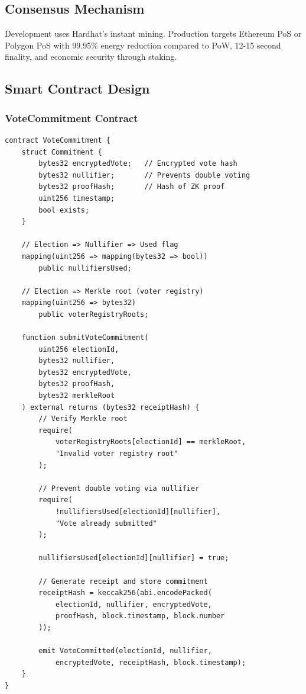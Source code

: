 \documentclass[conference]{IEEEtran}
\begin{document}
\subsection{Consensus Mechanism}
Development uses Hardhat's instant mining. Production targets Ethereum PoS or Polygon PoS with 99.95\% energy reduction compared to PoW, 12-15 second finality, and economic security through staking.

\subsection{Smart Contract Design}

\subsubsection{VoteCommitment Contract}

\begin{lstlisting}[style=solidity, caption={VoteCommitment Core Structure}]
contract VoteCommitment {
    struct Commitment {
        bytes32 encryptedVote;   // Encrypted vote hash
        bytes32 nullifier;       // Prevents double voting
        bytes32 proofHash;       // Hash of ZK proof
        uint256 timestamp;
        bool exists;
    }
    
    // Election => Nullifier => Used flag
    mapping(uint256 => mapping(bytes32 => bool)) 
        public nullifiersUsed;
    
    // Election => Merkle root (voter registry)
    mapping(uint256 => bytes32) 
        public voterRegistryRoots;
    
    function submitVoteCommitment(
        uint256 electionId,
        bytes32 nullifier,
        bytes32 encryptedVote,
        bytes32 proofHash,
        bytes32 merkleRoot
    ) external returns (bytes32 receiptHash) {
        // Verify Merkle root
        require(
            voterRegistryRoots[electionId] == merkleRoot,
            "Invalid voter registry root"
        );
        
        // Prevent double voting via nullifier
        require(
            !nullifiersUsed[electionId][nullifier],
            "Vote already submitted"
        );
        
        nullifiersUsed[electionId][nullifier] = true;
        
        // Generate receipt and store commitment
        receiptHash = keccak256(abi.encodePacked(
            electionId, nullifier, encryptedVote,
            proofHash, block.timestamp, block.number
        ));
        
        emit VoteCommitted(electionId, nullifier,
            encryptedVote, receiptHash, block.timestamp);
    }
}
\end{lstlisting}
\end{document}
